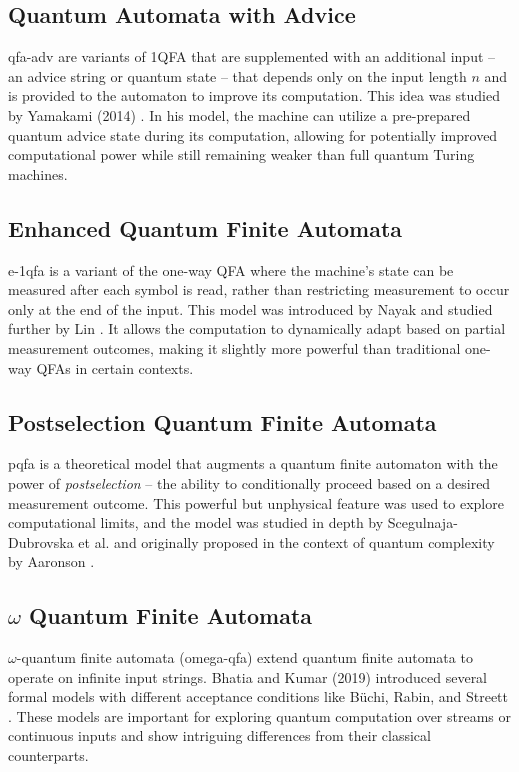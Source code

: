 \subsection{Quantum Automata with Advice} 
\gls{qfa-adv} are variants of 1QFA that are supplemented with an additional input – an advice string or quantum state – that depends only on the input length $n$ and is provided to the automaton to improve its computation. This idea was studied by Yamakami (2014) \cite{yamakami2014one}. In his model, the machine can utilize a pre-prepared quantum advice state during its computation, allowing for potentially improved computational power while still remaining weaker than full quantum Turing machines.

\subsection{Enhanced Quantum Finite Automata} 
\gls{e-1qfa} is a variant of the one-way QFA where the machine’s state can be measured after each symbol is read, rather than restricting measurement to occur only at the end of the input. This model was introduced by Nayak \cite{nayak1999optimal} and studied further by Lin \cite{lin2012another}. It allows the computation to dynamically adapt based on partial measurement outcomes, making it slightly more powerful than traditional one-way QFAs in certain contexts.

\subsection{Postselection Quantum Finite Automata} 
\gls{pqfa} is a theoretical model that augments a quantum finite automaton with the power of \emph{postselection} – the ability to conditionally proceed based on a desired measurement outcome. This powerful but unphysical feature was used to explore computational limits, and the model was studied in depth by Scegulnaja-Dubrovska et al. \cite{scegulnaja2010postselection} and originally proposed in the context of quantum complexity by Aaronson \cite{aaronson2005quantum}.

\subsection{\texorpdfstring{$\omega$}{omega} Quantum Finite Automata}
$\omega$-quantum finite automata (\gls{omega-qfa}) extend quantum finite automata to operate on infinite input strings. Bhatia and Kumar (2019) introduced several formal models with different acceptance conditions like Büchi, Rabin, and Streett \cite{bhatia2019quantum}. These models are important for exploring quantum computation over streams or continuous inputs and show intriguing differences from their classical counterparts.


